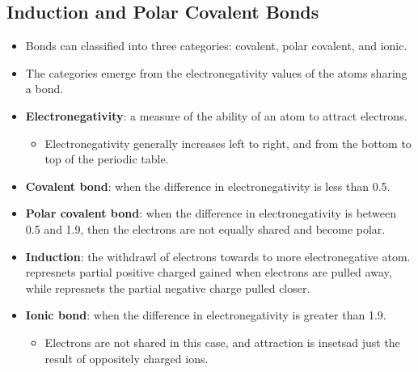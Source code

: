 \documentclass[12pt,a4paper]{article}
\begin{document}
\subsection{Induction and Polar Covalent Bonds}
\begin{itemize}
    \item Bonds can classified into three categories: covalent, polar covalent, and ionic.
    \item The categories emerge from the electronegativity values of the atoms sharing a bond.
    \item \textbf{Electronegativity}: a measure of the ability of an atom to attract electrons.
        \begin{itemize}
            \item Electronegativity generally {\color{o-Sun}increases left to right}, and from the {\color{o-Sun}bottom to top} of the periodic table.
        \end{itemize}
    \item \textbf{Covalent bond}: when the difference in electronegativity is {\color{o-Sun}less than 0.5}.
    \item \textbf{Polar covalent bond}: when the difference in electronegativity is {\color{o-Sun}between 0.5 and 1.9}, then the electrons are not equally shared and become polar.
    \item \textbf{Induction}: the withdrawl of electrons towards to more electronegative atom. {\color{pos}\ch{$\delta$^+}} represnets partial positive charged gained when electrons are pulled away, while {\color{neg}\ch{$\delta$^-}} represnets the partial negative charge pulled closer.
    \item \textbf{Ionic bond}: when the difference in electronegativity is {\color{o-Sun}greater than 1.9}.
        \begin{itemize}
            \item Electrons are not shared in this case, and attraction is insetsad just the result of oppositely charged ions.
        \end{itemize}
\end{itemize}
\end{document}
